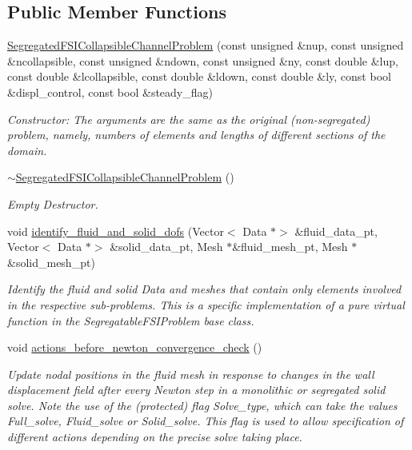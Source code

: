 \subsection*{Public Member Functions}
\begin{DoxyCompactItemize}
\item 
\hyperlink{classSegregatedFSICollapsibleChannelProblem_ac762b472c2baafa23dae6b9ce38f31da}{Segregated\+F\+S\+I\+Collapsible\+Channel\+Problem} (const unsigned \&nup, const unsigned \&ncollapsible, const unsigned \&ndown, const unsigned \&ny, const double \&lup, const double \&lcollapsible, const double \&ldown, const double \&ly, const bool \&displ\+\_\+control, const bool \&steady\+\_\+flag)
\begin{DoxyCompactList}\small\item\em Constructor\+: The arguments are the same as the original (non-\/segregated) problem, namely, numbers of elements and lengths of different sections of the domain. \end{DoxyCompactList}\item 
\hyperlink{classSegregatedFSICollapsibleChannelProblem_aa51bac3f0323fafcc86ff0bf0f6c010c}{$\sim$\+Segregated\+F\+S\+I\+Collapsible\+Channel\+Problem} ()
\begin{DoxyCompactList}\small\item\em Empty Destructor. \end{DoxyCompactList}\item 
void \hyperlink{classSegregatedFSICollapsibleChannelProblem_aa473522c98c5b70b8d35c0a7cdb1e42c}{identify\+\_\+fluid\+\_\+and\+\_\+solid\+\_\+dofs} (Vector$<$ Data $\ast$$>$ \&fluid\+\_\+data\+\_\+pt, Vector$<$ Data $\ast$$>$ \&solid\+\_\+data\+\_\+pt, Mesh $\ast$\&fluid\+\_\+mesh\+\_\+pt, Mesh $\ast$\&solid\+\_\+mesh\+\_\+pt)
\begin{DoxyCompactList}\small\item\em Identify the fluid and solid Data and meshes that contain only elements involved in the respective sub-\/problems. This is a specific implementation of a pure virtual function in the Segregatable\+F\+S\+I\+Problem base class. \end{DoxyCompactList}\item 
void \hyperlink{classSegregatedFSICollapsibleChannelProblem_a2613090b2abf3809de381da12f1cd0d2}{actions\+\_\+before\+\_\+newton\+\_\+convergence\+\_\+check} ()
\begin{DoxyCompactList}\small\item\em Update nodal positions in the fluid mesh in response to changes in the wall displacement field after every Newton step in a monolithic or segregated solid solve. Note the use of the (protected) flag Solve\+\_\+type, which can take the values Full\+\_\+solve, Fluid\+\_\+solve or Solid\+\_\+solve. This flag is used to allow specification of different actions depending on the precise solve taking place. \end{DoxyCompactList}\item 

\end{DoxyCompactItemize}
